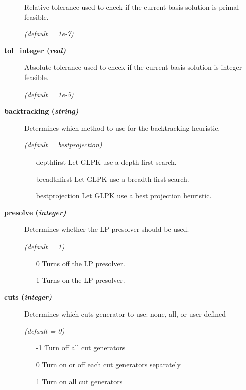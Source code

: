 \begin{description}
Relative tolerance used to check if the current basis solution is primal feasible.

\textsl{(default = 1e-7)}

\item[\label{glpktol_integer}\hypertarget{glpktol_integer}
{\textbf{tol\_integer (\slshape{real})}}]\hspace{1.0in}

Absolute tolerance used to check if the current basis solution is integer feasible.

\textsl{(default = 1e-5)}

\item[\label{backtracking}\hypertarget{backtracking}
{\textbf{backtracking (\slshape{string})}}]\hspace{1.0in}

Determines which method to use for the backtracking heuristic.

\textsl{(default = bestprojection)}
\begin{itemize}
\item[depthfirst] 
Let GLPK use a depth first search.
\item[breadthfirst] 
Let GLPK use a breadth first search.
\item[bestprojection] 
Let GLPK use a best projection heuristic.
\end{itemize}

\item[\label{glpkpresolve}\hypertarget{glpkpresolve}
{\textbf{presolve (\slshape{integer})}}]\hspace{1.0in}

Determines whether the LP presolver should be used.

\textsl{(default = 1)}
\begin{itemize}
\item[0] 
Turns off the LP presolver.
\item[1] 
Turns on the LP presolver.
\end{itemize}

\item[\label{glpkcuts}\hypertarget{glpkcuts}
{\textbf{cuts (\slshape{integer})}}]\hspace{1.0in}

Determines which cuts generator to use: none, all, or user-defined

\textsl{(default = 0)}
\begin{itemize}
\item[-1] 
Turn off all cut generators
\item[0] 
Turn on or off each cut generators separately
\item[1] 
Turn on all cut generators
\end{itemize}


\end{description}
